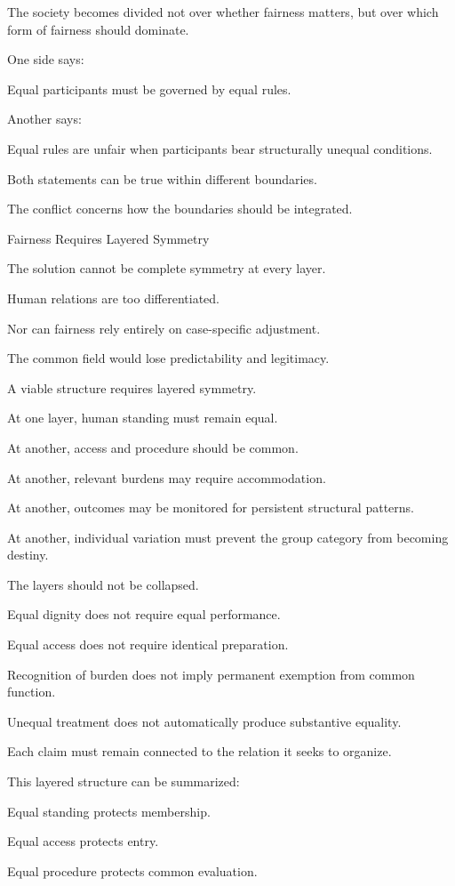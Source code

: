 The society becomes divided not over whether fairness matters, but over which form of fairness should dominate.

One side says:

Equal participants must be governed by equal rules.

Another says:

Equal rules are unfair when participants bear structurally unequal conditions.

Both statements can be true within different boundaries.

The conflict concerns how the boundaries should be integrated.

Fairness Requires Layered Symmetry

The solution cannot be complete symmetry at every layer.

Human relations are too differentiated.

Nor can fairness rely entirely on case-specific adjustment.

The common field would lose predictability and legitimacy.

A viable structure requires layered symmetry.

At one layer, human standing must remain equal.

At another, access and procedure should be common.

At another, relevant burdens may require accommodation.

At another, outcomes may be monitored for persistent structural patterns.

At another, individual variation must prevent the group category from becoming destiny.

The layers should not be collapsed.

Equal dignity does not require equal performance.

Equal access does not require identical preparation.

Recognition of burden does not imply permanent exemption from common function.

Unequal treatment does not automatically produce substantive equality.

Each claim must remain connected to the relation it seeks to organize.

This layered structure can be summarized:

Equal standing protects membership.

Equal access protects entry.

Equal procedure protects common evaluation.

